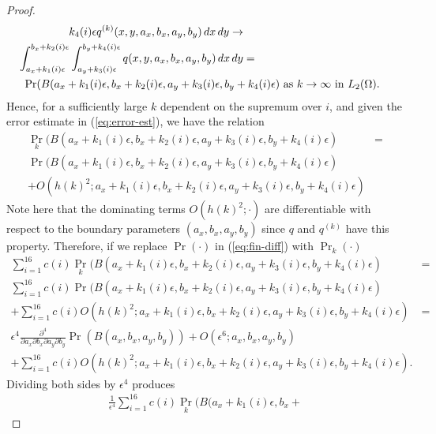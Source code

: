 \begin{proof}
\begin{align*}
{    k_4(i)\epsilon} q^{(k)}(x,y,a_x,b_x,a_y,b_y)\, dx\, dy \to \\
   \displaystyle
     \int_{a_x + k_1(i)\epsilon}^{b_x + k_2(i)\epsilon} \displaystyle \int_{a_y +
     k_3(i)\epsilon}^{b_y + k_4(i)\epsilon} q(x,y,a_x,b_x,a_y,b_y)\, dx\, dy &= \\
    \MoveEqLeft[20] \Pr(B(a_x + k_1(i)\epsilon, b_x + k_2(i)\epsilon, a_y +
    k_3(i)\epsilon, b_y + k_4(i)\epsilon) \mbox{ as } k \to \infty \mbox{ in } L_2(\Omega).
  \end{align*}
  Hence, for a sufficiently large $k$ dependent on the supremum over
  $i$, and given the error estimate in (\ref{eq:error-est}), we have
  the relation
  \begin{align*}
    \Pr_k(B(a_x + k_1(i)\epsilon, b_x + k_2(i)\epsilon, a_y +
    k_3(i)\epsilon, b_y + k_4(i)\epsilon) &= \\
    \Pr(B(a_x + k_1(i)\epsilon, b_x + k_2(i)\epsilon, a_y +
    k_3(i)\epsilon, b_y + k_4(i)\epsilon) &\\
    + O(h(k)^2; a_x + k_1(i)\epsilon, b_x + k_2(i)\epsilon, a_y + k_3(i)\epsilon, b_y + k_4(i)\epsilon) &
  \end{align*}
  Note here that the dominating terms $O(h(k)^2; \cdot)$ are
  differentiable with respect to the boundary parameters
  $(a_x, b_x, a_y, b_y)$ since $q$ and $q^{(k)}$ have this
  property. Therefore, if we replace $\Pr(\cdot)$ in
  (\ref{eq:fin-diff}) with $\Pr_k(\cdot)$
  \begin{align*}
    \sum_{i=1}^{16} c(i) \Pr_k(B(a_x + k_1(i)\epsilon, b_x +
    k_2(i)\epsilon, a_y + k_3(i)\epsilon, b_y + k_4(i)\epsilon) &= \\
    \sum_{i=1}^{16} c(i) \Pr(B(a_x + k_1(i)\epsilon, b_x +
    k_2(i)\epsilon, a_y + k_3(i)\epsilon, b_y + k_4(i)\epsilon) &  \\
    + \sum_{i=1}^{16} c(i) O(h(k)^2; a_x + k_1(i)\epsilon, b_x +
    k_2(i)\epsilon, a_y + k_3(i)\epsilon, b_y + k_4(i)\epsilon) &= \\
    \epsilon^4 \frac{\partial^4}{\partial a_x \partial b_x \partial
    a_y \partial b_y} \Pr(B(a_x, b_x, a_y, b_y)) + O(\epsilon^6 ;
    a_x, b_x, a_y, b_y) & \\
    + \sum_{i=1}^{16} c(i) O(h(k)^2; a_x + k_1(i)\epsilon, b_x +
    k_2(i)\epsilon, a_y + k_3(i)\epsilon, b_y + k_4(i)\epsilon). &
  \end{align*}
  Dividing both sides by $\epsilon^4$ produces
  \begin{align*}
    \frac{1}{\epsilon^4} \sum_{i=1}^{16} c(i) \Pr_k(B(a_x + k_1(i)\epsilon, b_x +

\end{align*}
\end{proof}
